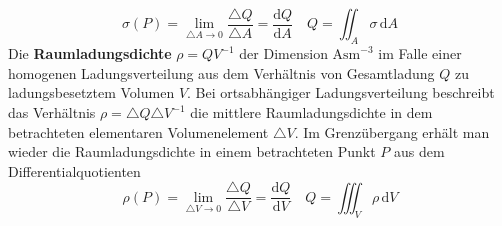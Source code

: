 \begin{equation}
\boxed{\sigma\left(P\right)=\displaystyle \lim_{\triangle A\rightarrow 0}\dfrac{\triangle Q}{\triangle A}=\dfrac{\text{d}Q}{\text{d}A}}\quad \boxed{Q=\displaystyle \iint_A\sigma\,\text{d}A}
\end{equation}
Die \textbf{Raumladungsdichte} $\rho=QV^{-1}$ der Dimension $\text{Asm}^{-3}$ im Falle einer homogenen Ladungsverteilung aus dem Verhältnis von Gesamtladung $Q$ zu ladungsbesetztem Volumen $V$. Bei ortsabhängiger Ladungsverteilung beschreibt das Verhältnis $\rho=\triangle Q\triangle V^{-1}$ die mittlere Raumladungsdichte in dem betrachteten elementaren Volumenelement $\triangle V$. Im Grenzübergang erhält man wieder die Raumladungsdichte in einem betrachteten Punkt $P$ aus dem Differentialquotienten
\begin{equation} 
\boxed{\rho\left(P\right)=\displaystyle \lim_{\triangle V\rightarrow 0}\dfrac{\triangle Q}{\triangle V}=\dfrac{\text{d}Q}{\text{d}V}}\quad \boxed{Q=\displaystyle \iiint_V\rho\,\text{d}V}
\end{equation} 
